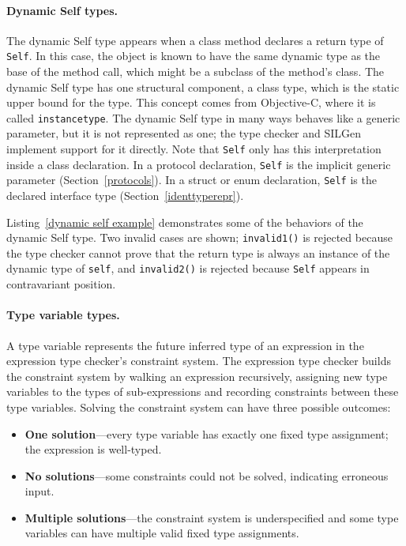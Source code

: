 \documentclass[../generics]{subfiles}
\begin{document}
\paragraph{Dynamic Self types.}
The dynamic Self type appears when a class method declares a return type of \texttt{Self}. In this case, the object is known to have the same dynamic type as the base of the method call, which might be a subclass of the method's class. The dynamic Self type has one structural component, a class type, which is the static upper bound for the type. This concept comes from Objective-C, where it is called \texttt{instancetype}. The dynamic Self type in many ways behaves like a generic parameter, but it is not represented as one; the type checker and SILGen implement support for it directly. Note that \texttt{Self} only has this interpretation inside a class declaration. In a protocol declaration, \texttt{Self} is the implicit generic parameter (Section~\ref{protocols}). In a struct or enum declaration, \texttt{Self} is the declared interface type (Section~\ref{identtyperepr}).

Listing~\ref{dynamic self example} demonstrates some of the behaviors of the dynamic Self type. Two invalid cases are shown; \texttt{invalid1()} is rejected because the type checker cannot prove that the return type is always an instance of the dynamic type of \texttt{self}, and \texttt{invalid2()} is rejected because \texttt{Self} appears in contravariant position.

\paragraph{Type variable types.}
A type variable represents the future inferred type of an expression in the expression type checker's constraint system. The expression type checker builds the constraint system by walking an expression recursively, assigning new type variables to the types of sub-expressions and recording constraints between these type variables. Solving the constraint system can have three possible outcomes:
\begin{itemize}
\item \textbf{One solution}---every type variable has exactly one fixed type assignment; the expression is well-typed.
\item \textbf{No solutions}---some constraints could not be solved, indicating erroneous input.
\item \textbf{Multiple solutions}---the constraint system is underspecified and some type variables can have multiple valid fixed type assignments.
\end{itemize}
\end{document}
